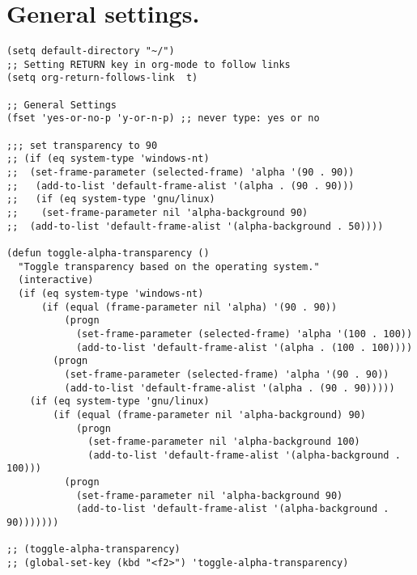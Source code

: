 \documentclass[11pt]{article}
\begin{document}
\section{General settings.}
\label{sec:orgfc2fbbf}
\begin{verbatim}
(setq default-directory "~/")
;; Setting RETURN key in org-mode to follow links
(setq org-return-follows-link  t)

;; General Settings
(fset 'yes-or-no-p 'y-or-n-p) ;; never type: yes or no

;;; set transparency to 90
;; (if (eq system-type 'windows-nt)
;; 	(set-frame-parameter (selected-frame) 'alpha '(90 . 90))
;;   (add-to-list 'default-frame-alist '(alpha . (90 . 90)))
;;   (if (eq system-type 'gnu/linux)
;; 	  (set-frame-parameter nil 'alpha-background 90)
;; 	(add-to-list 'default-frame-alist '(alpha-background . 50))))

(defun toggle-alpha-transparency ()
  "Toggle transparency based on the operating system."
  (interactive)
  (if (eq system-type 'windows-nt)
      (if (equal (frame-parameter nil 'alpha) '(90 . 90))
          (progn
            (set-frame-parameter (selected-frame) 'alpha '(100 . 100))
            (add-to-list 'default-frame-alist '(alpha . (100 . 100))))
        (progn
          (set-frame-parameter (selected-frame) 'alpha '(90 . 90))
          (add-to-list 'default-frame-alist '(alpha . (90 . 90)))))
    (if (eq system-type 'gnu/linux)
        (if (equal (frame-parameter nil 'alpha-background) 90)
            (progn
              (set-frame-parameter nil 'alpha-background 100)
              (add-to-list 'default-frame-alist '(alpha-background . 100)))
          (progn
            (set-frame-parameter nil 'alpha-background 90)
            (add-to-list 'default-frame-alist '(alpha-background . 90)))))))

;; (toggle-alpha-transparency)
;; (global-set-key (kbd "<f2>") 'toggle-alpha-transparency)


\end{verbatim}
\end{document}
